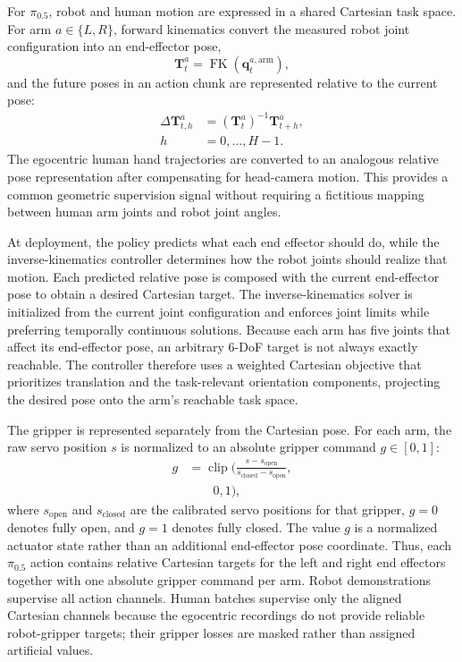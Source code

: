 \documentclass[10pt,conference]{IEEEtran}
\begin{document}
For $\pi_{0.5}$, robot and human motion are expressed in a shared Cartesian
task space. For arm \(a\in\{L,R\}\), forward kinematics convert the measured
robot joint configuration into an end-effector pose,
\begin{equation}
    \mathbf{T}^{a}_t =
    \operatorname{FK}\!\left(\mathbf{q}^{a,\mathrm{arm}}_t\right),
\end{equation}
and the future poses in an action chunk are represented relative to the current
pose:
\begin{equation}
\begin{aligned}
    \Delta\mathbf{T}^{a}_{t,h}
    &=
    \left(\mathbf{T}^{a}_t\right)^{-1}
    \mathbf{T}^{a}_{t+h},
    \\
    h &= 0,\ldots,H-1.
\end{aligned}
\end{equation}
The egocentric human hand trajectories are converted to an analogous relative
pose representation after compensating for head-camera motion. This provides
a common geometric supervision signal without requiring a fictitious mapping
between human arm joints and robot joint angles.

At deployment, the policy predicts what each end effector should do, while the
inverse-kinematics controller determines how the robot joints should realize
that motion. Each predicted relative pose is composed with the current
end-effector pose to obtain a desired Cartesian target. The inverse-kinematics
solver is initialized from the current joint configuration and enforces joint
limits while preferring temporally continuous solutions. Because each arm has
five joints that affect its end-effector pose, an arbitrary 6-DoF target is not
always exactly reachable. The controller therefore uses a weighted Cartesian
objective that prioritizes translation and the task-relevant orientation
components, projecting the desired pose onto the arm's reachable task space.

The gripper is represented separately from the Cartesian pose. For each arm,
the raw servo position \(s\) is normalized to an absolute gripper command
\(g\in[0,1]\):
\begin{equation}
\begin{aligned}
    g &=
    \operatorname{clip}\!\Biggl(
        \frac{s-s_{\mathrm{open}}}
             {s_{\mathrm{closed}}-s_{\mathrm{open}}},
    \\
    &\qquad 0,1\Biggr),
\end{aligned}
\end{equation}
where \(s_{\mathrm{open}}\) and \(s_{\mathrm{closed}}\) are the calibrated
servo positions for that gripper, \(g=0\) denotes fully open, and \(g=1\)
denotes fully closed. The value \(g\) is a normalized actuator state rather
than an additional end-effector pose coordinate. Thus, each
$\pi_{0.5}$ action contains relative Cartesian targets for the left and right
end effectors together with one absolute gripper command per arm. Robot
demonstrations supervise all action channels. Human batches supervise only the
aligned Cartesian channels because the egocentric recordings do not provide
reliable robot-gripper targets; their gripper losses are masked rather than
assigned artificial values.
\end{document}
